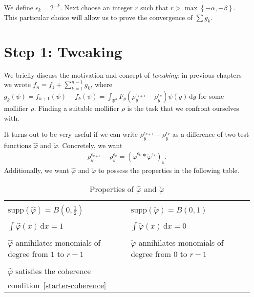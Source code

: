 We define \(\epsilon_k = 2^{-k}\). Next choose an integer \( r \) such that \( r > \max\left\{ -\alpha, -\beta \right\} \). This particular choice will allow us to prove the convergence of \(\sum g_k\). 

\section{Step 1: Tweaking}\label{chapter:step-1-tweaking}

We briefly discuss the motivation and concept of \emph{tweaking}: in previous chapters we wrote \(f_n = f_1 + \sum^{n-1}_{k=1}g_k\), where \( g_k(\psi) = f_{k+1}(\psi) - f_k(\psi) = \int_{\mathbb{R}^d} F_y(\rho_y^{\epsilon_{k+1}} - \rho_y^{\epsilon_k}) \psi(y)\, \mathrm{d}y \) for some mollifier \(\rho\). Finding a suitable mollifier \(\rho\) is the task that we confront ourselves with.

It turns out to be very useful if we can write \(\rho_y^{\epsilon_{k+1}} - \rho_y^{\epsilon_k}\) as a difference of two test functions \(\hat \varphi\) and \(\check \varphi\). Concretely, we want
\begin{align}\label{rho-dif}
    \rho_y^{\epsilon_{k+1}} - \rho_y^{\epsilon_k} = (\hat \varphi^{\epsilon_k} * \check \varphi^{\epsilon_k} )_y.
\end{align}
Additionally, we want \(\hat \varphi\) and \(\check \varphi\) to possess the properties in the following table.

\begin{table}[H]
\centering
\begin{tabular}{p{50mm}|p{50mm}} %
    \bottomrule
    \\[-0.5em]
    \(\mathrm{supp}(\hat \varphi) = B(0,\frac{1}{2})\) &  \(\mathrm{supp}(\check \varphi) = B(0,1)\)\\
    \\[-0.5em]
    \(\int \hat \varphi(x) \, \mathrm{d}x = 1\)&  \(\int \check \varphi(x) \, \mathrm{d}x = 0\)\\
    \\[-0.5em]
    \(\hat \varphi\) annihilates monomials \newline of degree from \(1\) to \(r-1\) & \(\check \varphi \) annihilates monomials  \newline of degree from \(0\) to \(r-1\)\\
    \\[-0.5em]
    \(\hat \varphi\) satisfies the coherence \\condition~\eqref{starter-coherence}& \\[0.5em]
    \toprule
\end{tabular}
\caption{Properties of \(\hat \varphi\) and \(\check \varphi\)}\label{table:properties-tweak}
\end{table}

